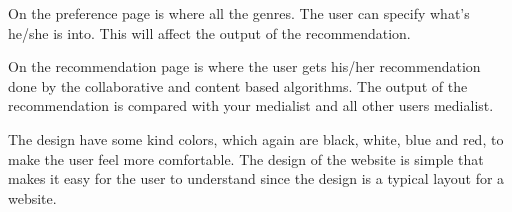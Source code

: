 On the preference page is where all the genres. The user can specify what’s he/she is into. This will affect the output of the recommendation.

On the recommendation page is where the user gets his/her recommendation done by the collaborative and content based algorithms. The output of the recommendation is compared with your medialist and all other users medialist.

The design have some kind colors, which again are black, white, blue and red, to make the user feel more comfortable. The design of the website is simple that makes it easy for the user to understand since the design is a typical layout for a website.
